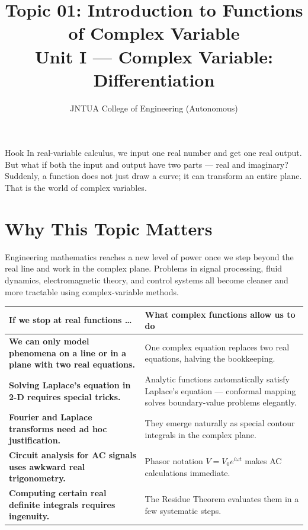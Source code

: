 \documentclass[12pt,a4paper]{article}
\title{Topic 01: Introduction to Functions of Complex Variable \\
       \large Unit I --- Complex Variable: Differentiation}
\author{JNTUA College of Engineering (Autonomous)}
\date{}
\begin{document}

\maketitle
\tableofcontents
\newpage

\begin{curiositybox}{Hook}
In real-variable calculus, we input one real number and get one real output.
But what if both the input and output have two parts --- real and imaginary?
Suddenly, a function does not just draw a curve; it can transform an entire
plane.  That is the world of complex variables.
\end{curiositybox}

\section{Why This Topic Matters}

Engineering mathematics reaches a new level of power once we step beyond the
real line and work in the complex plane.  Problems in signal processing,
fluid dynamics, electromagnetic theory, and control systems all become
cleaner and more tractable using complex-variable methods.

\begin{center}
\begin{tabular}{>{\bfseries}p{6.5cm} p{6.5cm}}
\toprule
If we stop at real functions \ldots & What complex functions allow us to do \\
\midrule
We can only model phenomena on a line or in a plane with two real equations.
& One complex equation replaces two real equations, halving the bookkeeping. \\
\addlinespace
Solving Laplace's equation in 2-D requires special tricks.
& Analytic functions automatically satisfy Laplace's equation --- conformal
  mapping solves boundary-value problems elegantly. \\
\addlinespace
Fourier and Laplace transforms need ad hoc justification.
& They emerge naturally as special contour integrals in the complex plane. \\
\addlinespace
Circuit analysis for AC signals uses awkward real trigonometry.
& Phasor notation \(V = V_0 e^{i\omega t}\) makes AC calculations immediate. \\
\addlinespace
Computing certain real definite integrals requires ingenuity.
& The Residue Theorem evaluates them in a few systematic steps. \\
\bottomrule
\end{tabular}
\end{center}
\end{document}
